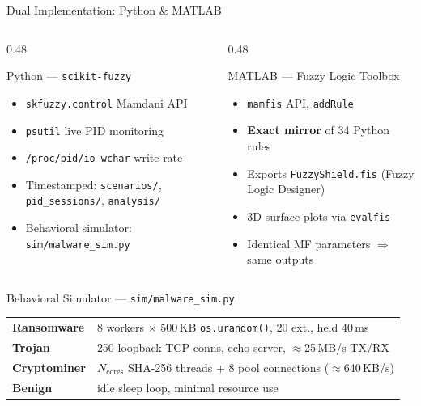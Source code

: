 \documentclass[aspectratio=169,12pt]{beamer}
\newcommand{\R}[1]{\textcolor{accent-r}{\textbf{#1}}}
\newcommand{\T}[1]{\textcolor{accent-t}{\textbf{#1}}}
\newcommand{\C}[1]{\textcolor{accent-c}{\textbf{#1}}}
\newcommand{\G}[1]{\textcolor{accent-g}{\textbf{#1}}}
\begin{document}
\begin{frame}{Dual Implementation: Python \& MATLAB}
  \begin{columns}[T]
    \begin{column}{0.48\textwidth}
      \begin{block}{Python — \texttt{scikit-fuzzy}}
        \begin{itemize}\footnotesize\setlength{\itemsep}{2pt}
          \item \texttt{skfuzzy.control} Mamdani API
          \item \texttt{psutil} live PID monitoring
          \item \texttt{/proc/pid/io wchar} write rate
          \item Timestamped: \texttt{scenarios/},
                \texttt{pid\_sessions/}, \texttt{analysis/}
          \item Behavioral simulator: \texttt{sim/malware\_sim.py}
        \end{itemize}
      \end{block}
    \end{column}
    \begin{column}{0.48\textwidth}
      \begin{block}{MATLAB — Fuzzy Logic Toolbox}
        \begin{itemize}\footnotesize\setlength{\itemsep}{2pt}
          \item \texttt{mamfis} API, \texttt{addRule}
          \item \textbf{Exact mirror} of 34 Python rules
          \item Exports \texttt{FuzzyShield.fis} (Fuzzy Logic Designer)
          \item 3D surface plots via \texttt{evalfis}
          \item Identical MF parameters $\Rightarrow$ same outputs
        \end{itemize}
      \end{block}
    \end{column}
  \end{columns}
  \vspace{0.1em}
  \begin{block}{Behavioral Simulator — \texttt{sim/malware\_sim.py}}
    \scriptsize
    \setlength{\tabcolsep}{5pt}
    \renewcommand{\arraystretch}{1.05}
    \begin{tabular}{@{} l p{9.5cm} @{}}
      \R{Ransomware}  & 8 workers $\times$ 500\,KB \texttt{os.urandom()}, 20 ext., held 40\,ms \\
      \T{Trojan}      & 250 loopback TCP conns, echo server, $\approx$25\,MB/s TX/RX \\
      \C{Cryptominer} & $N_\text{cores}$ SHA-256 threads + 8 pool connections ($\approx$640\,KB/s)\\
      \G{Benign}      & idle sleep loop, minimal resource use \\
    \end{tabular}
  \end{block}
\end{frame}
\end{document}
